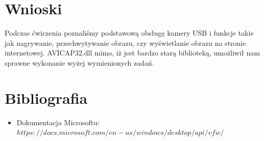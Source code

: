 \documentclass[12pt,a4paper,notitlepage]{report}
\begin{document}
\section{Wnioski}
Podczas ćwiczenia poznaliśmy podstawową obsługę kamery USB i funkcje takie jak nagrywanie, przechwytywanie obrazu, czy wyświetlanie obrazu na stronie internetowej. AVICAP32.dll mimo, iż jest bardzo starą biblioteką, umożliwił nam sprawne wykonanie wyżej wymienionych zadań.
\section{Bibliografia}
\begin{itemize}
\item Dokumentacja Microsoftu:
\\
$https://docs.microsoft.com/en-us/windows/desktop/api/vfw/$
\end{itemize}
\end{document}
